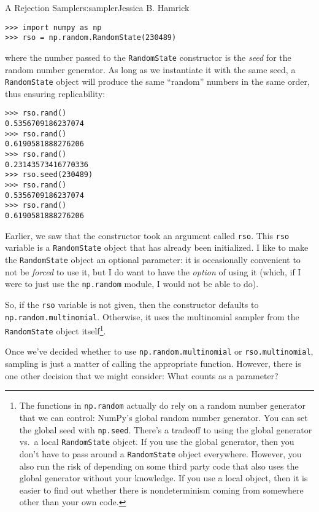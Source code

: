 \begin{aosachapter}{A Rejection Sampler}{s:sampler}{Jessica B. Hamrick}
\begin{verbatim}
>>> import numpy as np
>>> rso = np.random.RandomState(230489)
\end{verbatim}

where the number passed to the \texttt{RandomState} constructor is the
\emph{seed} for the random number generator. As long as we instantiate
it with the same seed, a \texttt{RandomState} object will produce the
same ``random'' numbers in the same order, thus ensuring replicability:

\begin{verbatim}
>>> rso.rand()
0.5356709186237074
>>> rso.rand()
0.6190581888276206
>>> rso.rand()
0.23143573416770336
>>> rso.seed(230489)
>>> rso.rand()
0.5356709186237074
>>> rso.rand()
0.6190581888276206
\end{verbatim}

Earlier, we saw that the constructor took an argument called
\texttt{rso}. This \texttt{rso} variable is a \texttt{RandomState}
object that has already been initialized. I like to make the
\texttt{RandomState} object an optional parameter: it is occasionally
convenient to not be \emph{forced} to use it, but I do want to have the
\emph{option} of using it (which, if I were to just use the
\texttt{np.random} module, I would not be able to do).

So, if the \texttt{rso} variable is not given, then the constructor
defaults to \texttt{np.random.multinomial}. Otherwise, it uses the
multinomial sampler from the \texttt{RandomState} object
itself\footnote{The functions in \texttt{np.random} actually do rely on
  a random number generator that we can control: NumPy's global random
  number generator. You can set the global seed with \texttt{np.seed}.
  There's a tradeoff to using the global generator vs.~a local
  \texttt{RandomState} object. If you use the global generator, then you
  don't have to pass around a \texttt{RandomState} object everywhere.
  However, you also run the risk of depending on some third party code
  that also uses the global generator without your knowledge. If you use
  a local object, then it is easier to find out whether there is
  nondeterminism coming from somewhere other than your own code.}.

\label{whats-a-parameter}

Once we've decided whether to use \texttt{np.random.multinomial} or
\texttt{rso.multinomial}, sampling is just a matter of calling the
appropriate function. However, there is one other decision that we might
consider: What counts as a parameter?


\end{aosachapter}
